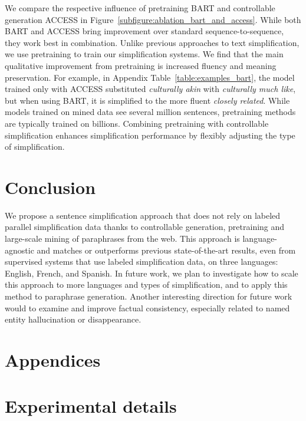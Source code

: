 \documentclass[11pt]{article}
\newcommand{\bart}{\textsc{BART}\xspace}
\newcommand{\access}{\mbox{\textsc{ACCESS}}\xspace}
\begin{document}
We compare the respective influence of pretraining \bart and controllable generation \access in Figure~\ref{subfigure:ablation_bart_and_access}. While both \bart and \access bring improvement over standard sequence-to-sequence, they work best in combination.
Unlike previous approaches to text simplification, we use pretraining to train our simplification systems. We find that the main qualitative improvement from pretraining is increased fluency and meaning preservation. For example, in Appendix Table~\ref{table:examples_bart}, the model trained only with \access substituted \textit{culturally akin} with \textit{culturally much like}, but when using BART, it is simplified to the more fluent \textit{closely related}. 
While models trained on mined data see several million sentences, pretraining methods are typically trained on billions. Combining pretraining with controllable simplification enhances simplification performance by flexibly adjusting the type of simplification. \section{Conclusion}

We propose a sentence simplification approach that does not rely on labeled  parallel simplification data thanks to controllable generation, pretraining and large-scale mining of paraphrases from the web.
This approach is language-agnostic and matches or outperforms previous state-of-the-art results, even from supervised systems that use labeled  simplification data, on three languages: English, French, and Spanish. 
In future work, we plan to investigate how to scale this approach to more languages and types of simplification, and to apply this method to paraphrase generation.
Another interesting direction for future work would to examine and improve factual consistency, especially related to named entity hallucination or disappearance. 







\clearpage
\appendix

\section*{Appendices}


\section{Experimental details} \label{sec:experimental_details}
\end{document}
